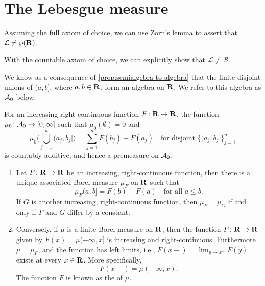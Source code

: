 \section{The Lebesgue measure}
\begin{fact}
    Assuming the full axiom of choice, we can use Zorn's lemma to assert that $\mathcal{L} \neq \wp(\mathbf{R})$.
\end{fact}

\begin{fact}
    With the countable axiom of choice, we can explicitly show that $\mathcal L \neq \mathcal B$.
\end{fact}

We know as a consequence of \cref{prop:semialgebra-to-algebra} that the finite disjoint unions of $(a,b]$, where $a,b\in \mathbf{R}$, form an algebra on $\mathbf{R}$. We refer to this algebra as $\mathcal{A}_0$ below.

\begin{thm} \label{thm:premeasure-h-intervals}
    For an increasing right-continuous function $F\colon \mathbf{R} \to \mathbf{R}$, the function $\mu_0\colon \mathcal{A}_0 \to [0,\infty]$ such that $\mu_0(\emptyset) = 0$ and \[
        \mu_0\biggl(\bigcup_{j=1}^n (a_j,b_j]\biggr) = \sum_{j=1}^n F(b_j) - F(a_j)\quad \text{for disjoint }\{(a_j,b_j]\}_{j=1}^n
    \] is countably additive, and hence a premeasure on $\mathcal{A}_0$.
\end{thm}

\begin{thm} \label{thm:increasing-rcont-Borel-measure-connection} \leavevmode
    \begin{enumerate}
        \item \label{enu:CDF-measure} Let $F\colon \mathbf{R} \to \mathbf{R}$ be an increasing, right-continuous function, then there is a unique associated Borel measure $\mu_F$ on $\mathbf{R}$ such that \[
            \mu_F(a,b] = F(b) - F(a)\quad \text{for all }a\leq b.
        \]
    If $G$ is another increasing, right-continuous function, then $\mu_F = \mu_G$ if and only if $F$ and $G$ differ by a constant.
        \item \label{enu:measure-CDF} Conversely, if $\mu$ is a finite Borel measure on $\mathbf{R}$, then the function $F\colon \mathbf{R} \to \mathbf{R}$ given by $F(x) = \mu(-\infty,x]$ is increasing and right-continuous. Furthermore $\mu = \mu_F$, and the function has left limits, i.e., $F(x-) = \lim_{y \to x^-} F(y)$ exists at every $x \in \mathbf{R}$. More specifically, \begin{equation} \label{eq:CDF-left-limits}
             F(x-) = \mu(-\infty,x).
        \end{equation}
        The function $F$ is known as the  of $\mu$.
    \end{enumerate}
\end{thm}

